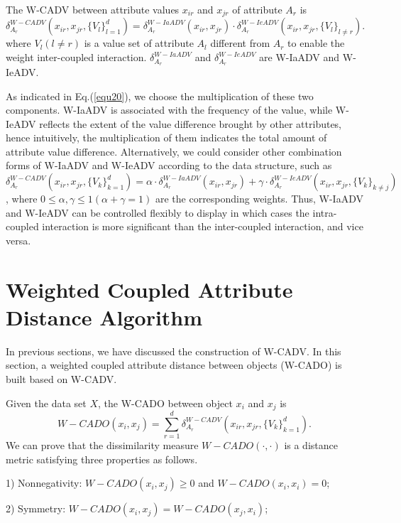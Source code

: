 \documentclass[review]{elsarticle}
\begin{document}
The W-CADV between attribute values $x_{ir}$ and $x_{jr}$ of attribute $A_r$ is
\begin{equation}
\delta_{A_r}^{W-CADV}(x_{ir},x_{jr},\{V_l\}_{l = 1} ^ d) = \delta_{A_r}^{W-IaADV}(x_{ir},x_{jr}) \cdot \delta_{A_r}^{W-IeADV}(x_{ir},x_{jr},\{V_l\}_{l \neq r}).
\label{equ20}
\end{equation}
where $V_l (l \neq r)$ is a value set of attribute $A_l$ different from $A_r$ to enable the weight inter-coupled interaction. $\delta_{A_r}^{W-IaADV}$ and $\delta_{A_r}^{W-IeADV}$ are W-IaADV and W-IeADV.

As indicated in Eq.(\ref{equ20}), we choose the multiplication of these two components. W-IaADV is associated with the frequency of the value, while W-IeADV reflects the extent of the value difference brought by other attributes, hence intuitively, the multiplication of them indicates the total amount of attribute value difference. Alternatively, we could consider other combination forms of W-IaADV and W-IeADV according to the data structure, such as $\delta_{A_r}^{W-CADV}(x_{ir},x_{jr},\{V_k\}_{k = 1} ^ d) = \alpha \cdot \delta_{A_r}^{W-IaADV}(x_{ir},x_{jr}) + \gamma \cdot \delta_{A_r}^{W-IeADV}(x_{ir},x_{jr},\{V_k\}_{k \neq j})$, where $0 \leq \alpha,\gamma \leq 1 (\alpha+\gamma = 1)$
are the corresponding weights. Thus, W-IaADV and W-IeADV can be controlled flexibly to display in which cases the intra-coupled interaction is more significant than the inter-coupled interaction, and vice versa.

\section{Weighted Coupled Attribute Distance Algorithm}
In previous sections, we have discussed the construction of W-CADV. In this section, a weighted coupled attribute distance between objects (W-CADO) is built based on W-CADV.

Given the data set $X$, the W-CADO between object $x_i$ and $x_j$ is
\begin{equation}
W-CADO(x_i,x_j) = \sum_{r=1}^{d}\delta_{A_r}^{W-CADV}(x_{ir},x_{jr},\{V_k\}_{k = 1} ^ d)
\label{equ21}.
\end{equation}
We can prove that the dissimilarity measure $W-CADO(\cdot,\cdot)$ is a distance metric satisfying three properties as follows.

1) Nonnegativity: $W-CADO(x_i,x_j) \geq 0$ and $W-CADO(x_i,x_i) = 0$;

2) Symmetry: $W-CADO(x_i,x_j) = W-CADO(x_j,x_i)$;
\end{document}
